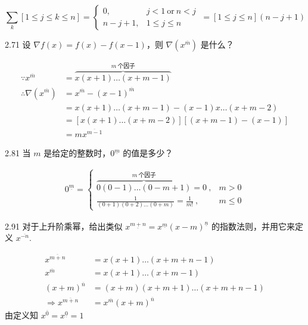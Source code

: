 \[
  \sum_k [1 \leq j \leq k \leq n] =
  \begin{cases}
    0, & j < 1 \ \text{or} \ n < j \\
    n - j + 1, & 1 \leq j \leq n
  \end{cases} \ = [1 \leq j \leq n] (n - j + 1)
\]

\begin{problem}{2.7}{1}
  设 \( \nabla f(x) = f(x) - f(x-1) \)，则 \( \nabla (x^{\overline{m}}) \) 是什么？
\end{problem}

\begin{align*}
  \because x^{\overline{m}} &= \overbrace{x (x+1) \dots (x + m - 1)}^{m \ \text{个因子}} \\
  \therefore \nabla (x^{\overline{m}}) &= x^{\overline{m}} - (x - 1)^{\overline{m}} \\
  &= x (x + 1) \dots (x + m - 1) - (x - 1) x \dots (x + m - 2) \\
  &= [x (x + 1) \dots (x + m - 2)][(x + m - 1) - (x - 1)] \\
  &= m x^{\overline{m-1}}
\end{align*}

\begin{problem}{2.8}{1}
  当 \( m \) 是给定的整数时，\( 0^{\underline{m}} \) 的值是多少？
\end{problem}

\begin{align*}
  0^{\underline{m}} =
  \begin{cases}
    \overbrace{0 (0 - 1) \dots (0 - m + 1)}^{m \ \text{个因子}} = 0 \ , & m > 0 \\
    \frac{1}{(0 + 1) (0 + 2) \dots (0 + m)} = \frac{1}{m!} \ , & m \leq 0
  \end{cases}
\end{align*}

\begin{problem}{2.9}{1}
  对于上升阶乘幂，给出类似 \( x^{\underline{m+n}} = x^{\underline{m}} (x-m)^{\underline{n}} \) 的指数法则，并用它来定义 \( x^{\overline{-n}} \).
\end{problem}

\begin{align*}
  x^{\overline{m+n}} &= x (x + 1) \dots (x + m + n - 1) \\
  x^{\overline{m}} &= x (x + 1) \dots (x + m - 1) \\
  (x + m)^{\overline{n}} &= (x + m) (x + m + 1) \dots (x + m + n - 1) \\
  \Rightarrow x^{\overline{m+n}} &= x^{\overline{m}} (x + m)^{\overline{n}}
\end{align*}
由定义知 \( x^{\overline{0}} = x^{\underline{0}} = 1 \)


